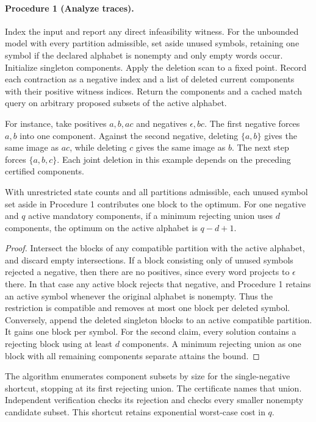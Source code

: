 \paragraph{Procedure 1 (Analyze traces).}
Index the input and report any direct infeasibility witness. For the
unbounded model with every partition admissible, set aside unused
symbols, retaining one symbol if the declared alphabet is nonempty
and only empty words occur. Initialize singleton components. Apply
the deletion scan to a fixed point. Record each contraction as a
negative index and a list of deleted current components with their
positive witness indices. Return the components and a cached match
query on arbitrary proposed subsets of the active alphabet.

For instance, take positives \(a,b,ac\) and negatives
\(\epsilon,bc\). The first negative forces \(a,b\) into one
component. Against the second negative, deleting \(\{a,b\}\) gives
the same image as \(ac\), while deleting \(c\) gives the same image
as \(b\). The next step forces \(\{a,b,c\}\). Each joint deletion
in this example depends on the preceding certified components.

\begin{lemma}
With unrestricted state counts and all partitions admissible,
each unused symbol set aside in Procedure 1 contributes one block
to the optimum. For one negative and \(q\) active mandatory
components, if a minimum rejecting union uses \(d\) components,
the optimum on the active alphabet is \(q-d+1\).
\end{lemma}
\begin{proof}
Intersect the blocks of any compatible partition with the active
alphabet, and discard empty intersections. If a block consisting
only of unused symbols rejected a negative, then there are no
positives, since every word projects to \(\epsilon\) there. In that
case any active block rejects that negative, and Procedure 1 retains
an active symbol whenever the original alphabet is nonempty.
Thus the restriction is compatible and removes at most one block
per deleted symbol. Conversely, append the deleted singleton blocks
to an active compatible partition. It gains one block per symbol.
For the second claim, every solution contains a rejecting block
using at least \(d\) components. A minimum rejecting union as one
block with all remaining components separate attains the bound.
\end{proof}

The algorithm enumerates component subsets by size for the
single-negative shortcut, stopping at its first rejecting union.
The certificate names that union. Independent verification checks
its rejection and checks every smaller nonempty candidate subset.
This shortcut retains exponential worst-case cost in \(q\).

